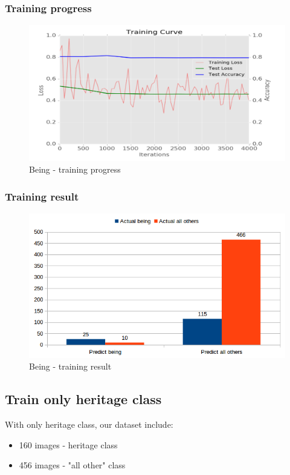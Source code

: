 \documentclass[11pt]{article}
\begin{document}
\subsubsection{Training progress}

\begin{figure}[H]
\centering
\includegraphics[width=1\textwidth]{images/train_only_being}
\caption{Being - training progress}
\end{figure}

\subsubsection{Training result}

\begin{figure}[H]
\centering
\includegraphics[width=1\textwidth]{images/being}
\caption{Being - training result}
\end{figure}


\subsection{Train only heritage class}
With only heritage class, our dataset include: 
\begin{itemize}
\item 160 images - heritage class
\item 456 images - "all other" class
\end{itemize}
\end{document}
